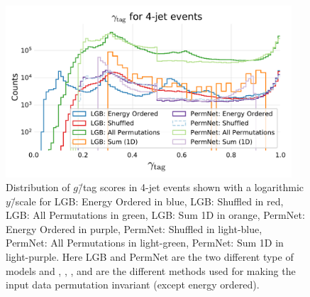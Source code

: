 \begin{figure}[ht]
  \centerfloat
  \includegraphics[width=0.95\textwidth, trim=10 10 10 45, clip]{figures/quarks/gtag_y_pred_4_jet_hist-down_sample=1.00-ML_vars=vertex-selection=b-ejet_min=4-n_iter_RS_lgb=99-n_iter_RS_xgb=9-cdot_cut=0.90-version=19.pdf}
  \caption[$g$\=/Tag Scores in 4-Jet Events]
          {Distribution of $g$\=/tag scores in 4-jet events shown with a logarithmic $y$\=/scale for LGB: Energy Ordered in blue, LGB: Shuffled in red, LGB: All Permutations in green, LGB: Sum 1D in orange, PermNet: Energy Ordered in purple, PermNet: Shuffled in light-blue, PermNet: All Permutations in light-green, PermNet: Sum 1D in light-purple.  Here LGB and PermNet are the two different type of models and , , , and  are the different methods used for making the input data permutation invariant (except energy ordered).}   
  \label{fig:q:gtag_scores_4j}
\end{figure}
\vspace{-3mm}

